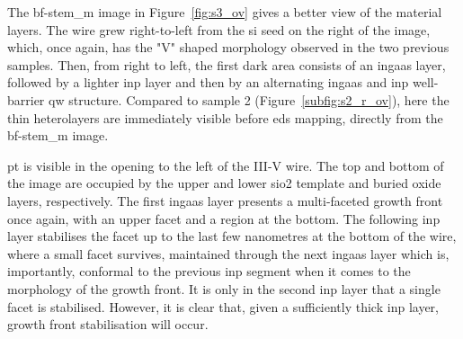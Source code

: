 The \acs{bf}-\acs{stem_m} image in Figure~\ref{fig:s3_ov} gives a better view of the material layers. The wire grew right-to-left from the \acl{si} seed on the right of the image, which, once again, has the "V" shaped morphology observed in the two previous samples. Then, from right to left, the first dark area consists of an \acs{ingaas} layer, followed by a lighter \acs{inp} layer and then by an alternating \acs{ingaas} and \acs{inp} well-barrier \acl{qw} structure. Compared to sample 2 (Figure~\ref{subfig:s2_r_ov}), here the thin heterolayers are immediately visible before \acs{eds} mapping, directly from the \acs{bf}-\acs{stem_m} image.

\Acl{pt} is visible in the opening to the left of the III-V wire. The top and bottom of the image are occupied by the upper and lower \acs{sio2} template and buried oxide layers, respectively. The first \acs{ingaas} layer presents a multi-faceted growth front once again, with an upper  facet and a  region at the bottom. The following \acs{inp} layer stabilises the  facet up to the last few nanometres at the bottom of the wire, where a small  facet survives, maintained through the next \acs{ingaas} layer which is, importantly, conformal to the previous \acs{inp} segment when it comes to the morphology of the growth front. It is only in the second \acs{inp} layer that a single  facet is stabilised. However, it is clear that, given a sufficiently thick \acs{inp} layer, growth front stabilisation will occur.

